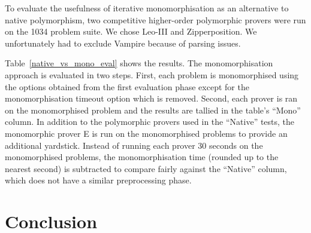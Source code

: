 \documentclass[runningheads]{llncs}
\begin{document}
To evaluate the usefulness of iterative monomorphisation as an alternative to native polymorphism, two competitive higher-order polymorphic provers were run on the 1034 problem suite. We chose Leo-III and Zipperposition. We unfortunately had to exclude Vampire because of parsing issues.

Table~\ref{native_vs_mono_eval} shows the results.
The monomorphisation approach is evaluated in two steps. First, each problem is monomorphised using the options obtained from the first evaluation phase except for the monomorphisation timeout option which is removed. Second, each prover is ran on the monomorphised problem and the results are tallied in the table's ``Mono'' column. In addition to the polymorphic provers used in the ``Native'' tests, the monomorphic prover E is run on the monomorphised problems to provide an additional yardstick. Instead of running each prover 30 seconds on the monomorphised problems, the monomorphisation time (rounded up to the nearest second) is subtracted to compare fairly against the ``Native'' column, which does not have a similar preprocessing phase.

%
%
%    

\section{Conclusion}
\label{sec:conclusion}
\end{document}
